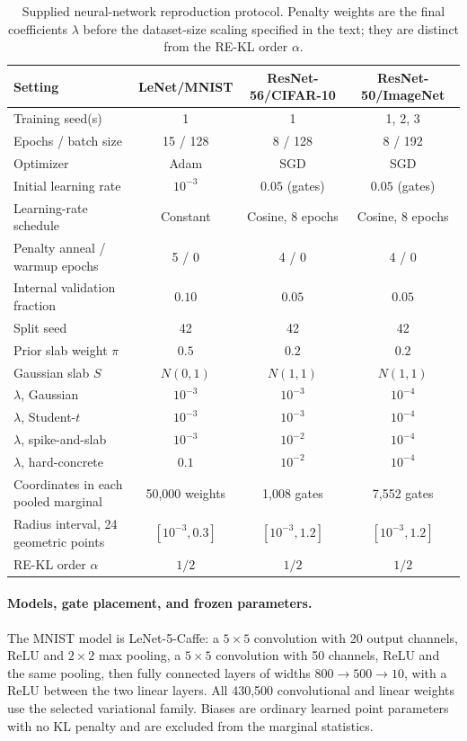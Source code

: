 \documentclass[11pt,a4paper]{article}
\theoremstyle{compactplain}
\theoremstyle{compactdefinition}
\numberwithin{equation}{section}
\begin{document}
\begin{table}[t]
\centering\small
\caption{Supplied neural-network reproduction protocol. Penalty weights
are the final coefficients \(\lambda\) before the dataset-size scaling
specified in the text; they are distinct from the RE-KL order \(\alpha\).}
\label{tab:nn_training_protocol}
\setlength{\tabcolsep}{5pt}
\renewcommand{\arraystretch}{1.12}
\begin{tabular}{lccc}
\toprule
Setting & LeNet/MNIST & ResNet-56/CIFAR-10 & ResNet-50/ImageNet \\
\midrule
Training seed(s) & 1 & 1 & 1, 2, 3 \\
Epochs / batch size & 15 / 128 & 8 / 128 & 8 / 192 \\
Optimizer & Adam & SGD & SGD \\
Initial learning rate & \(10^{-3}\) & \(0.05\) (gates) & \(0.05\) (gates) \\
Learning-rate schedule & Constant & Cosine, 8 epochs & Cosine, 8 epochs \\
Penalty anneal / warmup epochs & 5 / 0 & 4 / 0 & 4 / 0 \\
Internal validation fraction & \(0.10\) & \(0.05\) & \(0.05\) \\
Split seed & 42 & 42 & 42 \\
Prior slab weight \(\pi\) & \(0.5\) & \(0.2\) & \(0.2\) \\
Gaussian slab \(S\) & \(N(0,1)\) & \(N(1,1)\) & \(N(1,1)\) \\
\(\lambda\), Gaussian & \(10^{-3}\) & \(10^{-3}\) & \(10^{-4}\) \\
\(\lambda\), Student-\(t\) & \(10^{-3}\) & \(10^{-3}\) & \(10^{-4}\) \\
\(\lambda\), spike-and-slab & \(10^{-3}\) & \(10^{-2}\) & \(10^{-4}\) \\
\(\lambda\), hard-concrete & \(0.1\) & \(10^{-2}\) & \(10^{-4}\) \\
Coordinates in each pooled marginal & 50,000 weights & 1,008 gates & 7,552 gates \\
Radius interval, 24 geometric points & \([10^{-3},0.3]\) & \([10^{-3},1.2]\) & \([10^{-3},1.2]\) \\
RE-KL order \(\alpha\) & \(1/2\) & \(1/2\) & \(1/2\) \\
\bottomrule
\end{tabular}
\end{table}

\paragraph{Models, gate placement, and frozen parameters.}
The MNIST model is LeNet-5-Caffe: a \(5\times5\) convolution with
20 output channels, ReLU and \(2\times2\) max pooling, a
\(5\times5\) convolution with 50 channels, ReLU and the same pooling,
then fully connected layers of widths \(800\to500\to10\), with a
ReLU between the two linear layers. All 430,500 convolutional and linear
weights use the selected variational family. Biases are ordinary learned
point parameters with no KL penalty and are excluded from the marginal
statistics.
\end{document}
